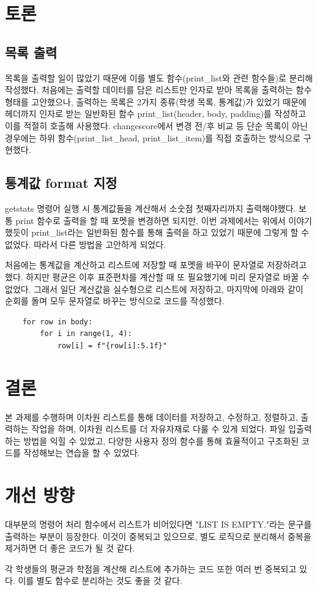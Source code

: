 \documentclass{article}
\begin{document}
\section{토론}

\subsection{목록 출력}

목록을 출력할 일이 많았기 때문에 이를 별도 함수(print\_list와 관련 함수들)로 분리해 작성했다. 
처음에는 출력할 데이터를 담은 리스트만 인자로 받아 목록을 출력하는 함수 형태를 고안했으나, 
출력하는 목록은 2가지 종류(학생 목록, 통계값)가 있었기 때문에 헤더까지 인자로 받는 일반화된 함수 print\_list(header, body, padding)를 작성하고 이를 적절히 호출해 사용했다.
changescore에서 변경 전/후 비교 등 단순 목록이 아닌 경우에는 하위 함수(print\_list\_head, print\_list\_item)를 직접 호출하는 방식으로 구현했다.

\subsection{통계값 format 지정}

getstats 명령어 실행 시 통계값들을 계산해서 소숫점 첫째자리까지 출력해야했다.
보통 print 함수로 출력을 할 때 포멧을 변경하면 되지만,
이번 과제에서는 위에서 이야기했듯이 print\_list라는 일반화된 함수를 통해 출력을
하고 있었기 때문에 그렇게 할 수 없었다. 따라서 다른 방법을 고안하게 되었다.

처음에는 통계값을 계산하고 리스트에 저장할 때 포멧을 바꾸이 문자열로 저장하려고 했다.
하지만 평균은 이후 표준편차를 계산할 때 또 필요했기에 미리 문자열로 바꿀 수 없었다.
그래서 일단 계산값을 실수형으로 리스트에 저장하고, 마지막에 아래와 같이 순회를 돌며 모두 문자열로 바꾸는 방식으로 코드를 작성했다.

\begin{verbatim}
    for row in body:
        for i in range(1, 4):
            row[i] = f"{row[i]:5.1f}"
\end{verbatim}


\section{결론}

본 과제를 수행하며 이차원 리스트를 통해 데이터를 저장하고, 수정하고, 정렬하고, 출력하는 작업을 하며,
이차원 리스트를 더 자유자재로 다룰 수 있게 되었다.
파일 입출력하는 방법을 익힐 수 있었고, 다양한 사용자 정의 함수를 통해
효율적이고 구조화된 코드를 작성해보는 연습을 할 수 있었다.

\section{개선 방향}

대부분의 명령어 처리 함수에서 리스트가 비어있다면 "LIST IS EMPTY."라는 문구를
출력하는 부분이 등장한다. 이것이 중복되고 있으므로,
별도 로직으로 분리해서 중복을 제거하면 더 좋은 코드가 될 것 같다.

각 학생들의 평균과 학점을 계산해 리스트에 추가하는 코드 또한 여러 번 중복되고 있다.
이를 별도 함수로 분리하는 것도 좋을 것 같다.
\end{document}
